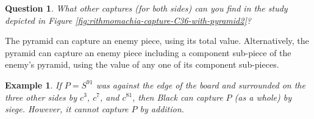 \documentclass[12pt]{article}
\newtheorem{example}[theorem]{Example}
\newtheorem{question}{Question}
\begin{document}
\begin{question}
What other captures (for both sides) can you find in the study
depicted in Figure \ref{fig:rithmomachia-capture-C36-with-pyramid2}?
\end{question}
  

The pyramid can capture an enemy piece, using its total value.
Alternatively, the pyramid can capture an enemy piece including a
component sub-piece of the enemy's pyramid, using the value of any
one of its component sub-pieces.

\begin{example}
If $P=S^{91}$ was against the edge of the board and surrounded on the three
other sides by $c^3$, $c^7$, and $c^{81}$,
then Black can capture $P$ (as a whole) by siege. However, it cannot capture $P$
by addition.
\end{example}
\end{document}

